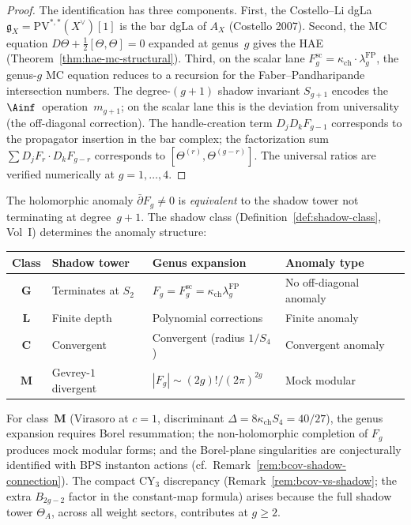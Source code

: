 \begin{proof}
The identification has three components. First, the Costello--Li dgLa $\mathfrak{g}_X = \mathrm{PV}^{*,*}(X^{\vee})[1]$ is the bar dgLa of $A_X$ (Costello 2007). Second, the MC equation $D\Theta + \frac{1}{2}[\Theta, \Theta] = 0$ expanded at genus~$g$ gives the HAE (Theorem~\ref{thm:hae-mc-structural}). Third, on the scalar lane $F_g^{\mathrm{sc}} = \kappa_{\mathrm{ch}} \cdot \lambda_g^{\mathrm{FP}}$, the genus-$g$ MC equation reduces to a recursion for the Faber--Pandharipande intersection numbers. The degree-$(g+1)$ shadow invariant $S_{g+1}$ encodes the $\Ainf$~operation~$m_{g+1}$; on the scalar lane this is the deviation from universality (the off-diagonal correction). The handle-creation term $D_j D_k F_{g-1}$ corresponds to the propagator insertion in the bar complex; the factorization sum $\sum D_j F_r \cdot D_k F_{g-r}$ corresponds to $[\Theta^{(r)}, \Theta^{(g-r)}]$. The universal ratios are verified numerically at $g = 1, \ldots, 4$.
\end{proof}

\begin{remark}
\label{rem:anomaly-shadow-nontermination}
The holomorphic anomaly $\bar\partial F_g \neq 0$ is \emph{equivalent} to the shadow tower not terminating at degree~$g+1$. The shadow class (Definition~\ref{def:shadow-class}, Vol~I) determines the anomaly structure:
\begin{center}
\small
\renewcommand{\arraystretch}{1.15}
\begin{tabular}{clll}
\toprule
\textbf{Class} & \textbf{Shadow tower} & \textbf{Genus expansion} & \textbf{Anomaly type} \\
\midrule
$\mathbf{G}$ & Terminates at $S_2$ & $F_g=F_g^{\mathrm{sc}}=\kappa_{\mathrm{ch}}\lambda_g^{\mathrm{FP}}$ & No off-diagonal anomaly \\
$\mathbf{L}$ & Finite depth & Polynomial corrections & Finite anomaly \\
$\mathbf{C}$ & Convergent & Convergent (radius $1/S_4$) & Convergent anomaly \\
$\mathbf{M}$ & Gevrey-$1$ divergent & $|F_g| \sim (2g)!/(2\pi)^{2g}$ & Mock modular \\
\bottomrule
\end{tabular}
\end{center}
For class~$\mathbf{M}$ (Virasoro at $c = 1$, discriminant $\Delta = 8\kappa_{\mathrm{ch}} S_4 = 40/27$), the genus expansion requires Borel resummation; the non-holomorphic completion of $F_g$ produces mock modular forms; and the Borel-plane singularities are conjecturally identified with BPS instanton actions (cf.~Remark~\ref{rem:bcov-shadow-connection}). The compact CY$_3$ discrepancy (Remark~\ref{rem:bcov-vs-shadow}; the extra $B_{2g-2}$ factor in the constant-map formula) arises because the full shadow tower $\Theta_A$, across all weight sectors, contributes at $g \geq 2$.
\end{remark}

